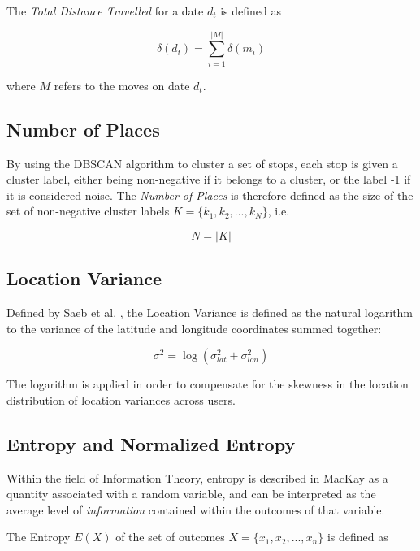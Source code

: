 The \textit{Total Distance Travelled} for a date $d_t$ is defined as 

\begin{equation}
\label{eq:feature-total-distance}
\delta (d_t) = \sum_{i=1}^{|M|} \delta (m_i)
\end{equation}

where $M$ refers to the moves on date $d_t$.

\subsection{Number of Places}
By using the DBSCAN algorithm to cluster a set of stops, each stop is given a cluster label, either being non-negative if it belongs to a cluster, or the label -1 if it is considered noise. The \textit{Number of Places} is therefore defined as the size of the set of non-negative cluster labels $K = \{k_1, k_2, ..., k_N\}$, i.e.

\begin{equation}
\label{eq:feature-num-places}
N = |K|
\end{equation}

\subsection{Location Variance}
Defined by Saeb et al. \cite{Saeb2015}, the Location Variance is defined as the natural logarithm to the variance of the latitude and longitude coordinates summed together: 

\begin{equation}
\label{eq:feature-log-var}
\sigma^2 = \log (\sigma_{lat}^2 + \sigma_{lon}^2)
\end{equation}

The logarithm is applied in order to compensate for the skewness in the location distribution of location variances across users.

\subsection{Entropy and Normalized Entropy}
Within the field of Information Theory, entropy is described in MacKay \cite{information-theory} as a quantity associated with a random variable, and can be interpreted as the average level of \textit{information} contained within the outcomes of that variable. 

The Entropy $E(X)$ of the set of outcomes $X = \{x_1, x_2, ..., x_n\}$ is defined as

